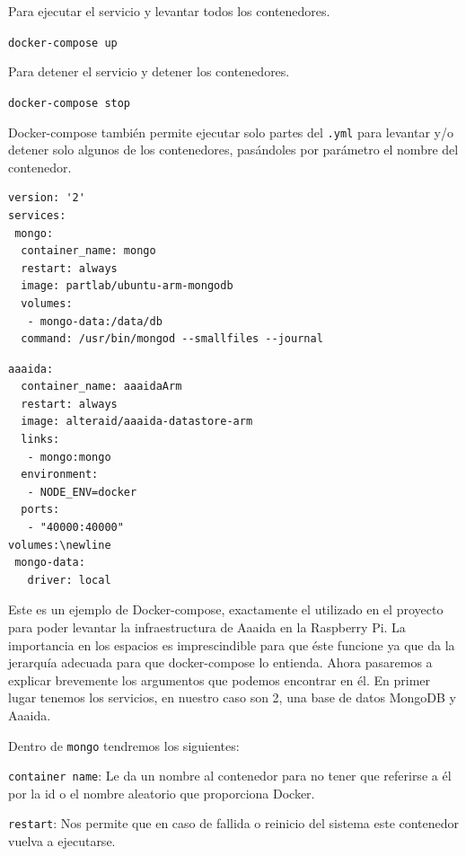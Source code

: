 Para ejecutar el servicio y levantar todos los contenedores.

\begin{center}
\texttt{docker-compose up}
\end{center} 

Para detener el servicio y detener los contenedores.

\begin{center}
\texttt{docker-compose stop}
\end{center} 

Docker-compose también permite ejecutar solo partes del \texttt{.yml} para levantar y/o detener solo algunos de los contenedores, pasándoles por parámetro el nombre del contenedor.

\begin{center}
\begin{lstlisting}[language=docker-compose-2,breaklines=true,label={code:compose}]
version: '2'
services:
 mongo:
  container_name: mongo
  restart: always
  image: partlab/ubuntu-arm-mongodb
  volumes:
   - mongo-data:/data/db
  command: /usr/bin/mongod --smallfiles --journal
  \end{lstlisting}
\pagebreak  
\begin{lstlisting}[language=docker-compose-2,breaklines=true,label={code:compose}]
 aaaida:
  container_name: aaaidaArm
  restart: always
  image: alteraid/aaaida-datastore-arm
  links:
   - mongo:mongo 
  environment:
   - NODE_ENV=docker
  ports:
   - "40000:40000"
volumes:\newline
 mongo-data:
   driver: local
\end{lstlisting}
\end{center}

Este es un ejemplo de Docker-compose, exactamente el utilizado en el proyecto para poder levantar la infraestructura de Aaaida en la Raspberry Pi. 
La importancia en los espacios es imprescindible para que éste funcione ya que da la jerarquía adecuada para que docker-compose lo entienda.
Ahora pasaremos a explicar brevemente los argumentos que podemos encontrar en él. 
En primer lugar tenemos los servicios, en nuestro caso son 2, una base de datos MongoDB y Aaaida.

Dentro de \texttt{mongo} tendremos los siguientes: 

\texttt{container name}: Le da un nombre al contenedor para no tener que referirse a él por la id o el nombre aleatorio que proporciona Docker.

\texttt{restart}: Nos permite que en caso de fallida o reinicio del sistema este contenedor vuelva a ejecutarse.

